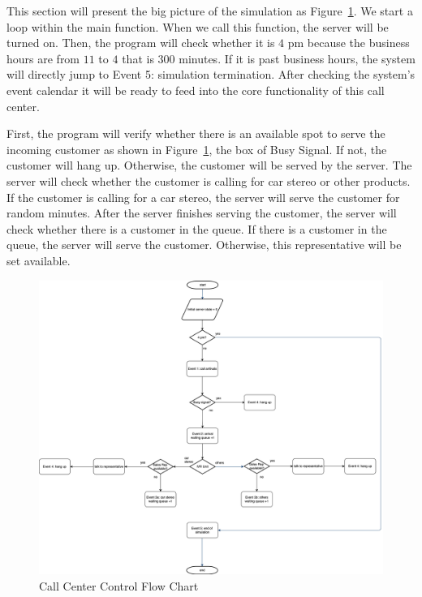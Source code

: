 \documentclass{article}
\begin{document}
This section will present the big picture of the simulation as Figure~\ref{fig:call_center}. We start a loop within the main function. When we call this function, the server will be turned on. Then, the program will check whether it is $4$ pm because the business hours are from $11$ to $4$ that is $300$ minutes. If it is past business hours, the system will directly jump to Event 5: simulation termination. After checking the system's event calendar it will be ready to feed into the core functionality of this call center. \\
\par
First, the program will verify whether there is an available spot to serve the incoming customer as shown in Figure~\ref{fig:call_center}, the box of Busy Signal. If not, the customer will hang up. Otherwise, the customer will be served by the server. The server will check whether the customer is calling for car stereo or other products. If the customer is calling for a car stereo, the server will serve the customer for random minutes. After the server finishes serving the customer, the server will check whether there is a customer in the queue. If there is a customer in the queue, the server will serve the customer. Otherwise, this representative  will be set available. 
\begin{figure}[t!]
\centering
\includegraphics[width=1.1\textwidth]{call_center.png}
\caption{Call Center Control Flow Chart}
\label{fig:call_center}
\end{figure}
\end{document}
